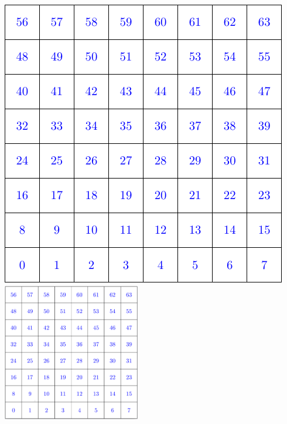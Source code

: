 \documentclass[a4paper,11pt]{article}
\begin{document}
\includegraphics[clip,rviewport=0.125 0.125 0.875 0.875]{images/grid8cm.pdf}
\includegraphics[width=6cm,clip,rviewport=0.125 0.125 0.875 0.875]{images/grid8cm.png}
\end{document}
